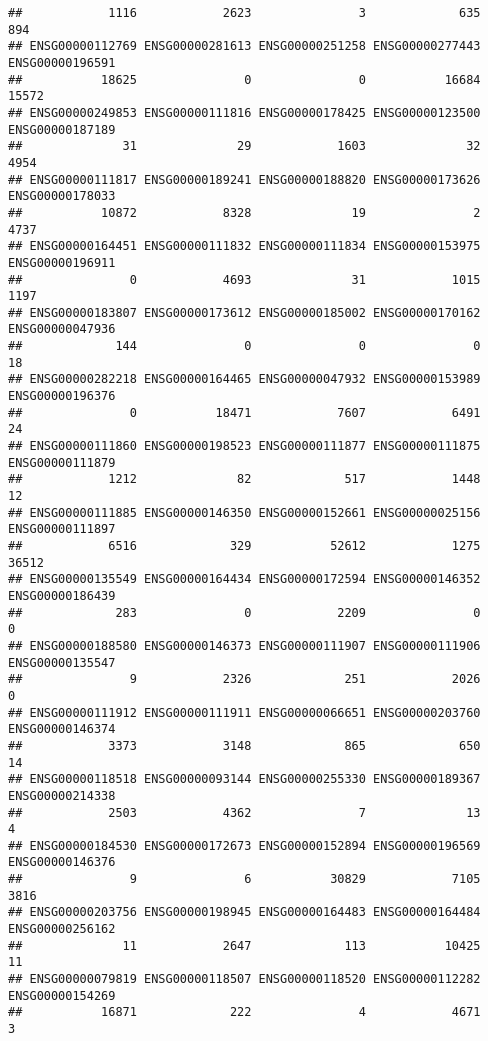 \documentclass[
]{article}
\begin{document}
\begin{verbatim}
##            1116            2623               3             635             894 
## ENSG00000112769 ENSG00000281613 ENSG00000251258 ENSG00000277443 ENSG00000196591 
##           18625               0               0           16684           15572 
## ENSG00000249853 ENSG00000111816 ENSG00000178425 ENSG00000123500 ENSG00000187189 
##              31              29            1603              32            4954 
## ENSG00000111817 ENSG00000189241 ENSG00000188820 ENSG00000173626 ENSG00000178033 
##           10872            8328              19               2            4737 
## ENSG00000164451 ENSG00000111832 ENSG00000111834 ENSG00000153975 ENSG00000196911 
##               0            4693              31            1015            1197 
## ENSG00000183807 ENSG00000173612 ENSG00000185002 ENSG00000170162 ENSG00000047936 
##             144               0               0               0              18 
## ENSG00000282218 ENSG00000164465 ENSG00000047932 ENSG00000153989 ENSG00000196376 
##               0           18471            7607            6491              24 
## ENSG00000111860 ENSG00000198523 ENSG00000111877 ENSG00000111875 ENSG00000111879 
##            1212              82             517            1448              12 
## ENSG00000111885 ENSG00000146350 ENSG00000152661 ENSG00000025156 ENSG00000111897 
##            6516             329           52612            1275           36512 
## ENSG00000135549 ENSG00000164434 ENSG00000172594 ENSG00000146352 ENSG00000186439 
##             283               0            2209               0               0 
## ENSG00000188580 ENSG00000146373 ENSG00000111907 ENSG00000111906 ENSG00000135547 
##               9            2326             251            2026               0 
## ENSG00000111912 ENSG00000111911 ENSG00000066651 ENSG00000203760 ENSG00000146374 
##            3373            3148             865             650              14 
## ENSG00000118518 ENSG00000093144 ENSG00000255330 ENSG00000189367 ENSG00000214338 
##            2503            4362               7              13               4 
## ENSG00000184530 ENSG00000172673 ENSG00000152894 ENSG00000196569 ENSG00000146376 
##               9               6           30829            7105            3816 
## ENSG00000203756 ENSG00000198945 ENSG00000164483 ENSG00000164484 ENSG00000256162 
##              11            2647             113           10425              11 
## ENSG00000079819 ENSG00000118507 ENSG00000118520 ENSG00000112282 ENSG00000154269 
##           16871             222               4            4671               3 

\end{verbatim}
\end{document}
